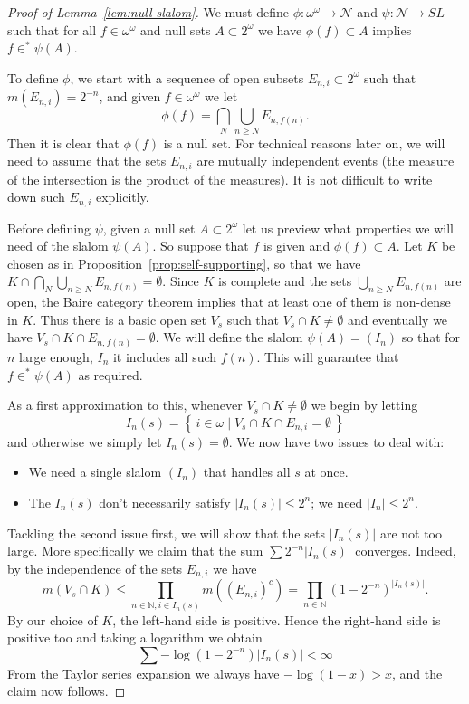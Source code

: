 \documentclass[11pt,oneside]{amsbook}
\newcommand{\set}[1]{\left\{\,#1\,\right\}}
\newcommand{\NN}{\mathbb N}
\newcommand{\Null}{\mathcal N}
\theoremstyle{definition}
\theoremstyle{plain}
\theoremstyle{definition}
\theoremstyle{remark}
\begin{document}
\begin{proof}[Proof of Lemma~\ref{lem:null-slalom}]
  We must define $\phi\colon\omega^\omega\to\Null$ and $\psi\colon\Null\to SL$ such that for all $f\in\omega^\omega$ and null sets $A\subset2^\omega$ we have $\phi(f)\subset A$ implies $f\in^*\psi(A)$.

  To define $\phi$, we start with a sequence of open subsets $E_{n,i}\subset2^\omega$ such that $m(E_{n,i})=2^{-n}$, and given $f\in\omega^\omega$ we let
  \[\phi(f)=\bigcap_N\bigcup_{n\geq N} E_{n,f(n)}\text{.}
  \]
  Then it is clear that $\phi(f)$ is a null set. For technical reasons later on, we will need to assume that the sets $E_{n,i}$ are mutually independent events (the measure of the intersection is the product of the measures). It is not difficult to write down such $E_{n,i}$ explicitly.

  Before defining $\psi$, given a null set $A\subset2^\omega$ let us preview what properties we will need of the slalom $\psi(A)$. So suppose that $f$ is given and $\phi(f)\subset A$. Let $K$ be chosen as in Proposition~\ref{prop:self-supporting}, so that we have $K\cap\bigcap_N\bigcup_{n\geq N}E_{n,f(n)}=\emptyset$. Since $K$ is complete and the sets $\bigcup_{n\geq N}E_{n,f(n)}$ are open, the Baire category theorem implies that at least one of them is non-dense in $K$. Thus there is a basic open set $V_s$ such that $V_s\cap K\neq\emptyset$ and eventually we have $V_s\cap K\cap E_{n,f(n)}=\emptyset$. We will define the slalom $\psi(A)=(I_n)$ so that for $n$ large enough, $I_n$ it includes all such $f(n)$. This will guarantee that $f\in^*\psi(A)$ as required.

  As a first approximation to this, whenever $V_s\cap K\neq\emptyset$ we begin by letting
  \[I_n(s)=\set{i\in\omega\mid V_s\cap K\cap E_{n,i}=\emptyset}
  \]
  and otherwise we simply let $I_n(s)=\emptyset$. We now have two issues to deal with:
  \begin{itemize}
  \item We need a single slalom $(I_n)$ that handles all $s$ at once.
  \item The $I_n(s)$ don't necessarily satisfy $|I_n(s)|\leq2^n$; we need $|I_n|\leq2^n$.
  \end{itemize}

  Tackling the second issue first, we will show that the sets $|I_n(s)|$ are not too large. More specifically we claim that the sum $\sum2^{-n}|I_n(s)|$ converges. Indeed, by the independence of the sets $E_{n,i}$ we have
  \[m(V_s\cap K)\leq\prod_{n\in\NN,i\in I_n(s)}m((E_{n,i})^c)
  =\prod_{n\in\NN}(1-2^{-n})^{|I_n(s)|}\text{.}
  \]
  By our choice of $K$, the left-hand side is positive. Hence the right-hand side is positive too and taking a logarithm we obtain
  \[\sum-\log(1-2^{-n})|I_n(s)|<\infty
  \]
  From the Taylor series expansion we always have $-\log(1-x)>x$, and the claim now follows.


\end{proof}
\end{document}
